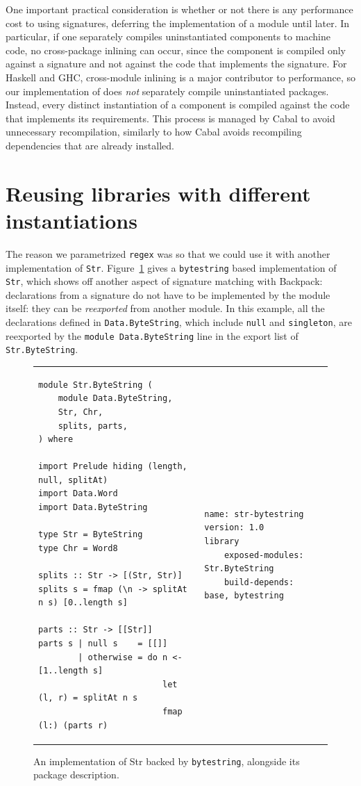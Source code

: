 One important practical consideration is whether or not there is any
performance cost to using signatures, deferring the implementation of
a module until later.  In particular, if one separately
compiles uninstantiated components to machine code, no cross-package
inlining can occur, since the component is compiled only against a
signature and not against the code that implements the signature.  For
Haskell and GHC, cross-module inlining is a major contributor to
performance, so our implementation of \Backpack{} does \emph{not}
separately compile uninstantiated packages. Instead, every distinct
instantiation of a component is compiled against the code that
implements its requirements. This process is managed by Cabal to avoid
unnecessary recompilation, similarly to how Cabal avoids recompiling
dependencies that are already installed.

\section{Reusing libraries with different instantiations}

The reason we parametrized \verb|regex| was so that we could use it
with another implementation of \verb|Str|.  Figure~\ref{fig:str-bytestring}
gives a \verb|bytestring| based implementation of \verb|Str|, which shows
off another aspect of signature matching with Backpack: declarations from
a signature do not have to be implemented by the module itself: they can
be \emph{reexported} from another module.  In this example, all the declarations
defined in \verb|Data.ByteString|, which include \verb|null| and \verb|singleton|,
are reexported by the \verb|module Data.ByteString| line in the export list
of \verb|Str.ByteString|.

\begin{figure}
\begin{tabular}{p{} p{}}
\begin{verbatim}
module Str.ByteString (
    module Data.ByteString,
    Str, Chr,
    splits, parts,
) where

import Prelude hiding (length, null, splitAt)
import Data.Word
import Data.ByteString

type Str = ByteString
type Chr = Word8

splits :: Str -> [(Str, Str)]
splits s = fmap (\n -> splitAt n s) [0..length s]

parts :: Str -> [[Str]]
parts s | null s    = [[]]
        | otherwise = do n <- [1..length s]
                         let (l, r) = splitAt n s
                         fmap (l:) (parts r)
\end{verbatim}
&
\begin{verbatim}
name: str-bytestring
version: 1.0
library
    exposed-modules: Str.ByteString
    build-depends: base, bytestring
\end{verbatim}
\end{tabular}
\caption{An implementation of Str backed by \texttt{bytestring},
alongside its package description.}
\label{fig:str-bytestring}
\end{figure}

